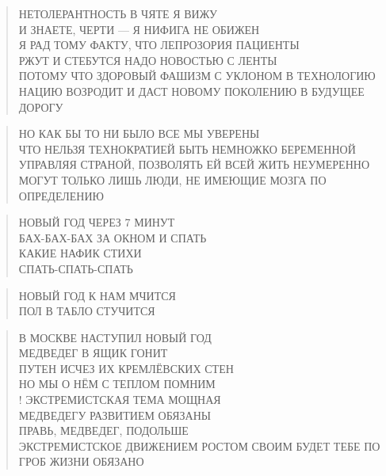 \poemtitle{***}
\begin{verse}
НЕТОЛЕРАНТНОСТЬ В ЧЯТЕ Я ВИЖУ\\
И ЗНАЕТЕ, ЧЕРТИ — Я НИФИГА НЕ ОБИЖЕН\\
Я РАД ТОМУ ФАКТУ, ЧТО ЛЕПРОЗОРИЯ ПАЦИЕНТЫ\\
РЖУТ И СТЕБУТСЯ НАДО НОВОСТЬЮ С ЛЕНТЫ\\
ПОТОМУ ЧТО ЗДОРОВЫЙ ФАШИЗМ С УКЛОНОМ В ТЕХНОЛОГИЮ\\
НАЦИЮ ВОЗРОДИТ И ДАСТ НОВОМУ ПОКОЛЕНИЮ В БУДУЩЕЕ ДОРОГУ
\end{verse}

\poemtitle{***}
\begin{verse}
НО КАК БЫ ТО НИ БЫЛО ВСЕ МЫ УВЕРЕНЫ\\
ЧТО НЕЛЬЗЯ ТЕХНОКРАТИЕЙ БЫТЬ НЕМНОЖКО БЕРЕМЕННОЙ\\
УПРАВЛЯЯ СТРАНОЙ, ПОЗВОЛЯТЬ ЕЙ ВСЕЙ ЖИТЬ НЕУМЕРЕННО\\
МОГУТ ТОЛЬКО ЛИШЬ ЛЮДИ, НЕ ИМЕЮЩИЕ МОЗГА ПО ОПРЕДЕЛЕНИЮ
\end{verse}

\poemtitle{***}
\begin{verse}
НОВЫЙ ГОД ЧЕРЕЗ 7 МИНУТ\\
БАХ-БАХ-БАХ ЗА ОКНОМ И СПАТЬ\\
КАКИЕ НАФИК СТИХИ\\
СПАТЬ-СПАТЬ-СПАТЬ
\end{verse}

\poemtitle{***}
\begin{verse}
НОВЫЙ ГОД К НАМ МЧИТСЯ\\
ПОЛ В ТАБЛО СТУЧИТСЯ
\end{verse}

\poemtitle{***}
\begin{verse}
В МОСКВЕ НАСТУПИЛ НОВЫЙ ГОД\\
МЕДВЕДЕГ В ЯЩИК ГОНИТ\\
ПУТЕН ИСЧЕЗ ИХ КРЕМЛЁВСКИХ СТЕН\\
НО МЫ О НЁМ С ТЕПЛОМ ПОМНИМ\\!
ЭКСТРЕМИСТСКАЯ ТЕМА МОЩНАЯ\\
МЕДВЕДЕГУ РАЗВИТИЕМ ОБЯЗАНЫ\\
ПРАВЬ, МЕДВЕДЕГ, ПОДОЛЬШЕ\\
ЭКСТРЕМИСТСКОЕ ДВИЖЕНИЕМ РОСТОМ СВОИМ БУДЕТ ТЕБЕ ПО ГРОБ ЖИЗНИ ОБЯЗАНО
\end{verse}

